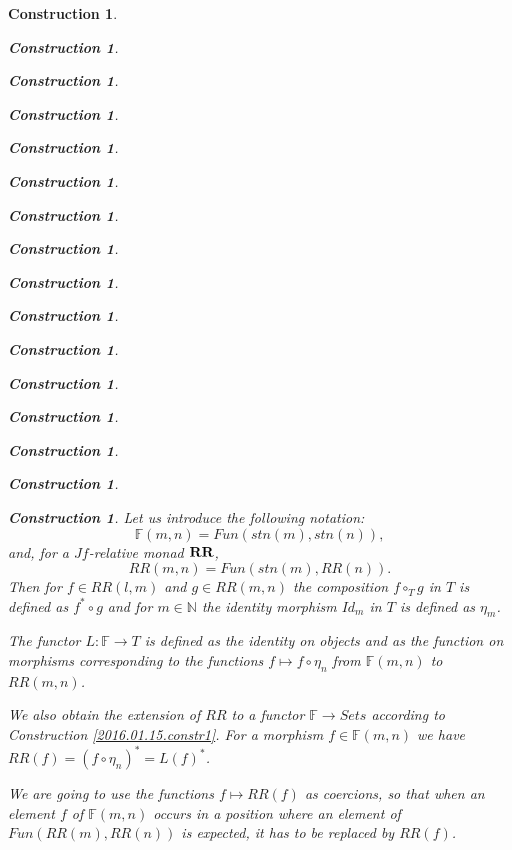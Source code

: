 \documentclass[onecolumn,12pt]{amsart}
\numberwithin{proposition}{subsection}
\newtheorem{construction}[proposition]{Construction}
\newcommand{\sr}{\rightarrow}
\newcommand{\nn}{{\mathbb N}}
\newcommand{\nat}{\nn}
\newcommand{\mbind}[1]{{#1^*}}
\newcommand{\hc}{\circ_{T}}
\newcommand{\RR}{{\bf RR}}
\newcommand{\FF}{{\mathbb F}}
\begin{document}
\begin{construction}
\begin{construction}
\begin{construction}
\begin{construction}
\begin{construction}
\begin{construction}
\begin{construction}
\begin{construction}
\begin{construction}
\begin{construction}
\begin{construction}
\begin{construction}
\begin{construction}
\begin{construction}
\begin{construction}
\begin{construction}
Let us introduce the following notation:
%
$$\FF(m,n)=Fun(stn(m),stn(n)),$$
%
and, for a $Jf$-relative monad $\RR$,
%
$$RR(m,n)=Fun(stn(m),RR(n)).$$
%
Then for $f\in RR(l,m)$ and $g\in RR(m,n)$ the composition $f\hc g$ in $T$ is
defined as $\mbind{f}\circ g$ and for $m\in\nat$ the identity morphism $Id_m$
in $T$ is defined as $\eta_{m}$.

The functor $L:\FF\sr T$ is defined as the identity on objects and as the
function on morphisms corresponding to the functions $f\mapsto f\circ \eta_{n}$
from $\FF(m,n)$ to $RR(m,n)$.

We also obtain the extension of $RR$ to a functor $\FF\sr Sets$ according to
Construction \ref{2016.01.15.constr1}. For a morphism $f\in \FF(m,n)$ we have
$RR(f)=\mbind{(f\circ \eta_{n})}=\mbind{L(f)}$.

We are going to use the functions $f\mapsto RR(f)$ as coercions, so that when an
element $f$ of $\FF(m,n)$ occurs in a position where an element of
$Fun(RR(m),RR(n))$ is expected, it has to be replaced by $RR(f)$.


\end{construction}
\end{construction}
\end{construction}
\end{construction}
\end{construction}
\end{construction}
\end{construction}
\end{construction}
\end{construction}
\end{construction}
\end{construction}
\end{construction}
\end{construction}
\end{construction}
\end{construction}
\end{construction}
\end{document}
